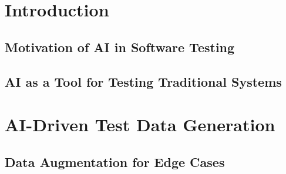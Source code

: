\documentclass[manuscript,screen,review]{acmart}
\begin{document}

\maketitle

\section{Introduction}

\subsection{Motivation of AI in Software Testing}

\subsection{AI as a Tool for Testing Traditional Systems}

\section{AI-Driven Test Data Generation}

\subsection{Data Augmentation for Edge Cases}
\end{document}
